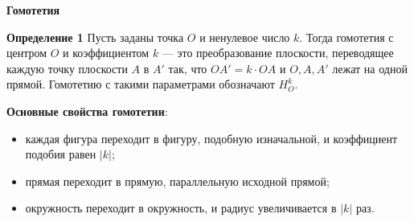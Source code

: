 \documentclass{article}
\begin{document}
\large

\begin{center}
	\textbf{Гомотетия}
\end{center}

\textbf{Определение 1} Пусть заданы точка $O$ и ненулевое число $k$. Тогда гомотетия с центром $O$ и коэффициентом $k$ — это преобразование плоскости, переводящее каждую точку плоскости $A$ в $A'$ так, что $OA' = k\cdot OA$ и $O, A, A'$ лежат на одной прямой. Гомотетию с такими параметрами обозначают $H^k_O$.

\textbf{Основные свойства гомотетии}:
\begin{itemize}
	\item каждая фигура переходит в фигуру, подобную изначальной, и коэффициент подобия равен $|k|$;
	
	\item прямая переходит в прямую, параллельную исходной прямой;
	
	\item окружность переходит в окружность, и радиус увеличивается в $|k|$ раз.
\end{itemize}
\end{document}
